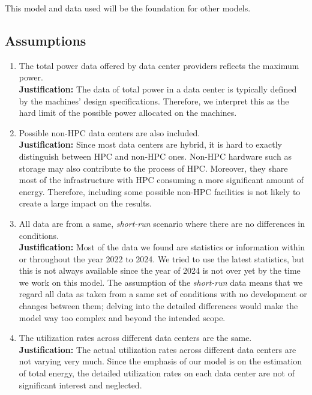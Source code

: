 \documentclass[12pt]{article}
\begin{document}
This model and data used will be the foundation for other models.

\subsection{Assumptions}
\label{sec_energy_model_assumptions}

\begin{enumerate}
	\item The total power data offered by data center providers reflects the maximum power. \\
	\textbf{Justification:} The data of total power in a data center is typically defined by the machines' design specifications. Therefore, we interpret this as the hard limit of the possible power allocated on the machines.
	
	\item Possible non-HPC data centers are also included. \\
	\textbf{Justification:} Since most data centers are hybrid, it is hard to exactly distinguish between HPC and non-HPC ones. Non-HPC hardware such as storage may also contribute to the process of HPC. Moreover, they share most of the infrastructure with HPC consuming a more significant amount of energy. Therefore, including some possible non-HPC facilities is not likely to create a large impact on the results.
	
	\item All data are from a same, \textit{short-run} scenario where there are no differences in conditions. \\
	\textbf{Justification:} Most of the data we found are statistics or information within or throughout the year 2022 to 2024. We tried to use the latest statistics, but this is not always available since the year of 2024 is not over yet by the time we work on this model. The assumption of the \textit{short-run} data means that we regard all data as taken from a same set of conditions with no development or changes between them; delving into the detailed differences would make the model way too complex and beyond the intended scope.

	\item The utilization rates across different data centers are the same. \\
	\textbf{Justification:} The actual utilization rates across different data centers are not varying very much. Since the emphasis of our model is on the estimation of total energy, the detailed utilization rates on each data center are not of significant interest and neglected.


\end{enumerate}
\end{document}
